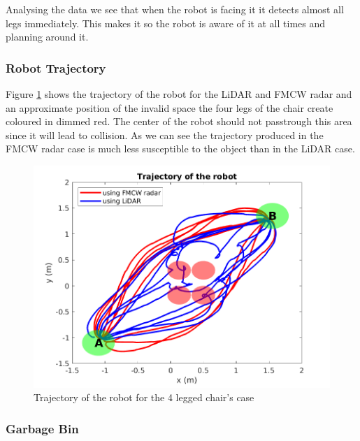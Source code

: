 Analysing the data we see that when the robot is facing it it detects almost all legs immediately. 
This makes it so the robot is aware of it at all times and planning around it.


\subsubsection*{Robot Trajectory}

Figure \ref{fig:traj2} shows the trajectory of the robot for the \ac{LiDAR} and \ac{FMCW} \ac{radar} and an approximate position of the invalid space the four legs of the chair create coloured in dimmed red. The center of the robot should not passtrough this area since it will lead to collision. As we can see the trajectory  produced in the \ac{FMCW} radar case is much less susceptible to the object than in the \ac{LiDAR} case. 
\begin{figure}[ht!]
\centerline{\includegraphics [width=0.7 \textwidth]{imgs/chapter5/traj2.png}}
\caption{Trajectory of the robot for the 4 legged chair's case}
\label{fig:traj2}
\end{figure}

\subsubsection{Garbage Bin}

